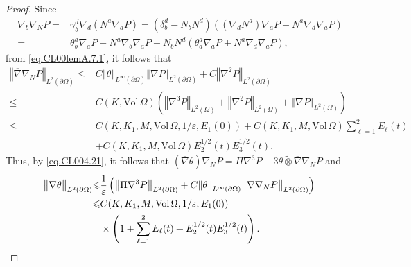 \documentclass[12pt,reqno]{amsart}
\numberwithin{equation}{section}
\theoremstyle{definition}
\theoremstyle{remark}
\begin{document}
\begin{proof}
Since
\begin{align*}
  {\overline{\nabla}}_b{\nabla}_N {P }=&\gamma_b^d{\nabla}_d (N^a{\nabla}_a {P })
  =(\delta_b^d-N_bN^d)(({\nabla}_dN^a){\nabla}_a {P }+N^a{\nabla}_d{\nabla}_a{P })\\
  =&\theta_b^a{\nabla}_a {P }+N^a{\nabla}_b{\nabla}_a{P }-N_bN^d(\theta_d^a{\nabla}_a{P }+N^a{\nabla}_d{\nabla}_a{P }),
\end{align*}
from \eqref{eq.CL00lemA.7.1},   it follows that
\begin{align*}
  {\left\Vert{{\overline{\nabla}}{\nabla}_N{P }}\right\Vert}_{L^2({\partial}\Omega)}
  {\leqslant}& C{\left\Vert{\theta}\right\Vert}_{L^\infty({\partial}\Omega)}{\left\Vert{{\nabla} {P }}\right\Vert}_{L^2({\partial}\Omega)}+C{\left\Vert{{\nabla}^2{P }}\right\Vert}_{L^2({\partial}\Omega)}\\
  {\leqslant}&C(K,{\mathrm{Vol}\,}\Omega)\left({\left\Vert{{\nabla}^3 {P }}\right\Vert}_{L^2(\Omega)}+{\left\Vert{{\nabla}^2 {P }}\right\Vert}_{L^2(\Omega)}+{\left\Vert{{\nabla} {P }}\right\Vert}_{L^2(\Omega)}\right)\\
  {\leqslant}& C(K,K_1,M,{\mathrm{Vol}\,}\Omega,1/{\varepsilon},E_1(0))+C(K,K_1,M,{\mathrm{Vol}\,}\Omega)\sum_{\ell=1}^2 E_\ell(t)\\
  &+C(K,K_1,M,{\mathrm{Vol}\,}\Omega)E_2^{1/2}(t)E_3^{1/2}(t).
\end{align*}
Thus, by \eqref{eq.CL004.21}, it follows that $({\overline{\nabla}}\theta){\nabla}_N {P }=\Pi{\nabla}^3 {P }-3\theta\tilde{\otimes}{\overline{\nabla}}{\nabla}_N {P }$ and
\begin{align}\label{eq.theta1}
  {\left\Vert{{\overline{\nabla}}\theta}\right\Vert}_{L^2({\partial}\Omega)}{\leqslant}& \frac{1}{\varepsilon}\left({\left\Vert{\Pi{\nabla}^3 {P }}\right\Vert}_{L^2({\partial}\Omega)}+C{\left\Vert{\theta}\right\Vert}_{L^\infty({\partial}\Omega)}{\left\Vert{{\overline{\nabla}}{\nabla}_N {P }}\right\Vert}_{L^2({\partial}\Omega)}\right){\nonumber}\\
  {\leqslant}&C(K,K_1,M,{\mathrm{Vol}\,}\Omega,1/{\varepsilon},E_1(0)){\nonumber}\\
  &\times\left(1+\sum_{\ell=1}^2 E_\ell(t)+E_2^{1/2}(t)E_3^{1/2}(t)\right).
\end{align}


\end{proof}
\end{document}
